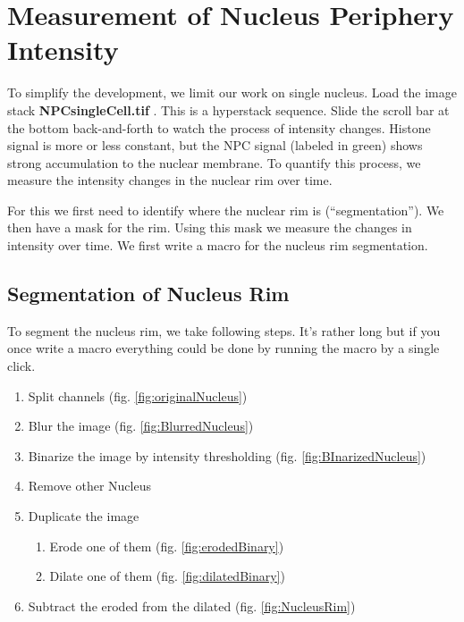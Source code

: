 \section{Measurement of Nucleus Periphery Intensity}

To simplify the development, we limit our work on single nucleus. Load the image stack \textbf{NPCsingleCell.tif} . This is a hyperstack sequence. Slide the scroll bar at the bottom back-and-forth to watch the process of intensity changes. Histone signal is more or less constant, but the NPC signal (labeled in green) shows strong accumulation to the nuclear membrane. To quantify this process, we measure the intensity changes in the nuclear rim over time.

For this we first need to identify where the nuclear rim is (``segmentation''). We then have a mask for the rim. Using this mask we measure the changes in intensity over time. We first write a macro for the nucleus rim segmentation.

\subsection{Segmentation of Nucleus Rim}

To segment the nucleus rim, we take following steps. It's rather long but if you once write a macro everything could be done by running the macro by a single click.

\begin{enumerate}
  \item Split channels (fig. \ref{fig:originalNucleus})
    \item Blur the image (fig. \ref{fig:BlurredNucleus})
    \item Binarize the image by intensity thresholding (fig. \ref{fig:BInarizedNucleus})
    \item Remove other Nucleus
    \item Duplicate the image

\begin{enumerate}
        \item Erode one of them (fig. \ref{fig:erodedBinary})

\item Dilate one of them (fig. \ref{fig:dilatedBinary})

\end{enumerate}
    \item Subtract the eroded from the dilated (fig. \ref{fig:NucleusRim})

\end{enumerate}